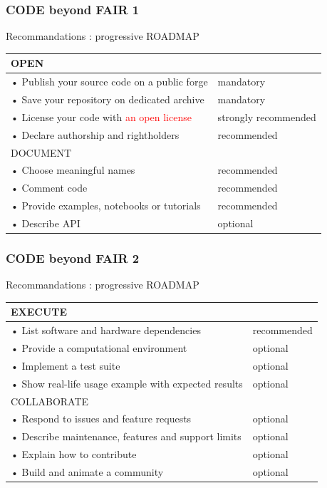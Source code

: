 \begin{frame}
\frametitle{CODE beyond FAIR 1}

Recommandations : progressive ROADMAP

\begin{tabular}{|l|l|}
  \hline
 \cellcolor{bl1} OPEN & \cellcolor{bl1}\\
    \hline 
• Publish your source code on a public forge & mandatory \\
• Save your repository on dedicated archive & mandatory \\
• License your code with \textcolor{red}{an open license} & strongly recommended \\
• Declare authorship and rightholders & recommended \\
  \hline 
 \cellcolor{bl1} DOCUMENT & \cellcolor{bl1}\\
    \hline 
• Choose meaningful names & recommended \\
• Comment code & recommended \\
• Provide examples, notebooks or tutorials & recommended \\
• Describe API & optional \\
  \hline 

\end{tabular}
\end{frame}






\begin{frame}
\frametitle{CODE beyond FAIR 2}

Recommandations : progressive ROADMAP

\begin{tabular}{|l|l|}
  \hline
\cellcolor{bl1} EXECUTE & \cellcolor{bl1}\\
    \hline 
• List software and hardware dependencies & recommended \\
• Provide a computational environment & optional \\
• Implement a test suite & optional \\
• Show real-life usage example with expected results & optional \\
  \hline 
\cellcolor{bl1}  COLLABORATE & \cellcolor{bl1}\\
    \hline 
• Respond to issues and feature requests & optional \\
• Describe maintenance, features and support limits & optional \\
• Explain how to contribute & optional \\
• Build and animate a community &  optional \\
  \hline 
\end{tabular}
\end{frame}


